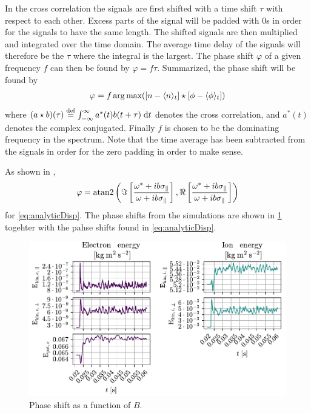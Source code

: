 In the cross correlation the signals are first shifted with a time shift $\tau$ with respect to each other.
Excess parts of the signal will be padded with $0$s in order for the signals to have the same length.
The shifted signals are then multiplied and integrated over the time domain.
The average time delay of the signals will therefore be the $\tau$ where the integral is the largest.
The phase shift $\varphi$ of a given frequency $f$ can then be found by $\varphi = f\tau$.
Summarized, the phase shift will be found by
%
\begin{align*}
    \varphi = f \arg\text{max}([n-\langle{n}\rangle_t] \star [\phi-\langle{\phi}\rangle_t])
\end{align*}
%
where $(a\star b)(\tau ) \overset{\text{def}}{=} \int_{-\infty }^{\infty} {a^{*}(t) b(t+\tau )} \; \text{d} {t}$ denotes the cross correlation, and $a^*(t)$ denotes the complex conjugated.
Finally $f$ is chosen to be the dominating frequency in the spectrum.
Note that the time average has been subtracted from the signals in order for the zero padding in order to make sense.

As shown in \cite{Pecseli2016book},
%
\begin{align}
    \varphi = \text{atan}2\left(
    \Im\left[\frac{\omega^*+ib\sigma_\|}{\omega+ib\sigma_\|}\right],
    \Re\left[\frac{\omega^*+ib\sigma_\|}{\omega+ib\sigma_\|}\right]
    \right)
\end{align}
%
for \cref{eq:analyticDisp}.
The phase shifts from the simulations are shown in \cref{fig:phaseShift} togehter with the pahse shifts found in \cref{eq:analyticDisp}.
%
\begin{figure}
    \includegraphics{fig/results/energyTrace/energyTraceB008}
    \caption{Phase shift as a function of $B$.}
    \label{fig:phaseShift}
\end{figure}


